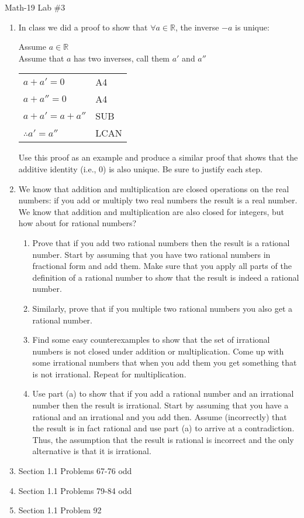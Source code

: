 \documentclass[letterpaper,12pt,fleqn]{article}
\begin{document}
\begin{center}
\Large Math-19 Lab \#3
\end{center}

\vspace{0.5in}

\begin{enumerate}
\item In class we did a proof to show that $\forall a\in\mathbb{R}$, the
inverse $-a$ is unique:
\begin{theproof}
Assume $a\in\mathbb{R}$ \\
Assume that $a$ has two inverses, call them $a'$ and $a''$

\begin{tabular}{ll}
$a+a'=0$ & A4 \\
$a+a''=0$ & A4 \\
$a+a'=a+a''$  & SUB \\
$\therefore a'=a''$ & LCAN \\
\end{tabular}
\end{theproof}

Use this proof as an example and produce a similar proof that shows that the
additive identity (i.e., 0) is also unique. Be sure to justify each step.

\item We know that addition and multiplication are closed operations on the
real numbers: if you add or multiply two real numbers the result is a real
number. We know that addition and multiplication are also closed for
integers, but how about for rational numbers?
\begin{enumerate}
\item Prove that if you add two rational numbers then the result is a rational
number. Start by assuming that you have two rational numbers in fractional form
and add them. Make sure that you apply all parts of the definition of a
rational number to show that the result is indeed a rational number.

\item Similarly, prove that if you multiple two rational numbers you also get a
rational number.

\item Find some easy counterexamples to show that the set of irrational numbers
is not closed under addition or multiplication. Come up with some irrational
numbers that when you add them you get something that is not irrational.
Repeat for multiplication.

\item Use part (a) to show that if you add a rational number and an irrational
number then the result is irrational. Start by assuming that you have a
rational and an irrational and you add then. Assume (incorrectly) that the
result is in fact rational and use part (a) to arrive at a contradiction. Thus,
the assumption that the result is rational is incorrect and the only
alternative is that it is irrational.
\end{enumerate}

\item Section 1.1 Problems 67-76 odd

\item Section 1.1 Problems 79-84 odd

\item Section 1.1 Problem 92
\end{enumerate}
\end{document}
